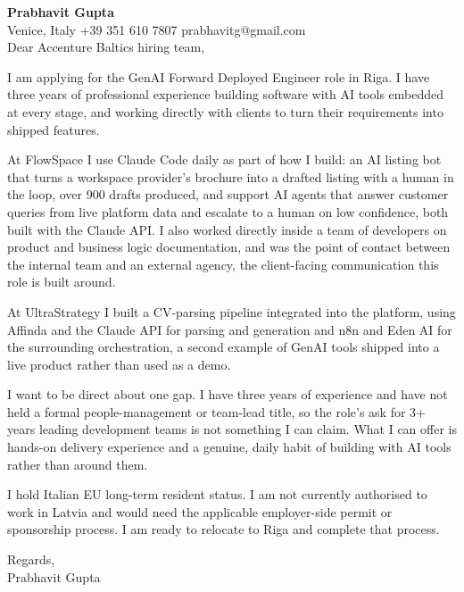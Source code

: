 \documentclass[a4paper,10.5pt]{article}
\begin{document}
\textbf{Prabhavit Gupta}\\
Venice, Italy \textbar{} +39 351 610 7807 \textbar{} prabhavitg@gmail.com\\[10pt]
Dear Accenture Baltics hiring team,

I am applying for the GenAI Forward Deployed Engineer role in Riga. I have three years of professional experience building software with AI tools embedded at every stage, and working directly with clients to turn their requirements into shipped features.

At FlowSpace I use Claude Code daily as part of how I build: an AI listing bot that turns a workspace provider's brochure into a drafted listing with a human in the loop, over 900 drafts produced, and support AI agents that answer customer queries from live platform data and escalate to a human on low confidence, both built with the Claude API. I also worked directly inside a team of developers on product and business logic documentation, and was the point of contact between the internal team and an external agency, the client-facing communication this role is built around.

At UltraStrategy I built a CV-parsing pipeline integrated into the platform, using Affinda and the Claude API for parsing and generation and n8n and Eden AI for the surrounding orchestration, a second example of GenAI tools shipped into a live product rather than used as a demo.

I want to be direct about one gap. I have three years of experience and have not held a formal people-management or team-lead title, so the role's ask for 3+ years leading development teams is not something I can claim. What I can offer is hands-on delivery experience and a genuine, daily habit of building with AI tools rather than around them.

I hold Italian EU long-term resident status. I am not currently authorised to work in Latvia and would need the applicable employer-side permit or sponsorship process. I am ready to relocate to Riga and complete that process.

Regards,\\
Prabhavit Gupta
\end{document}
